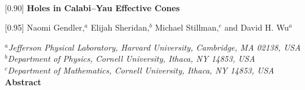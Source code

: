 \documentclass[11pt,dvipsnames]{article}
\theoremstyle{definition}
\begin{document}
	\pagestyle{plain}
	
	
	\makeatletter
	\makeatother
	\renewcommand{\theequation}{\thesection.\arabic{equation}}
	\pagestyle{empty}

\vspace{2cm}





\begin{center}
\phantom{a}\\
\vspace{0.8cm}
\scalebox{0.90}[0.90]{{\fontsize{24}{30} \bf{Holes in Calabi--Yau Effective Cones}}}\\
\end{center}

\vspace{0.4cm}
\begin{center}
\scalebox{0.95}[0.95]{{\fontsize{12}{30}\selectfont  
Naomi Gendler,$^{a}$
Elijah Sheridan,$^{b}$
Michael Stillman,$^{c}$ and
David H. Wu$^{a}$
}}
\end{center}


 


\begin{center}
%
%
\vspace{0.25 cm}

\textsl{$^{a}$Jefferson Physical Laboratory, Harvard University, Cambridge, MA 02138, USA}\\  
\textsl{$^{b}$Department of Physics, Cornell University, Ithaca, NY 14853, USA}\\
\textsl{$^{c}$Department of Mathematics, Cornell University, Ithaca, NY 14853, USA}\\ 


 

  \vspace{1.1cm}
	\normalsize{\bf Abstract} \\[8mm]
\end{center}
\end{document}
